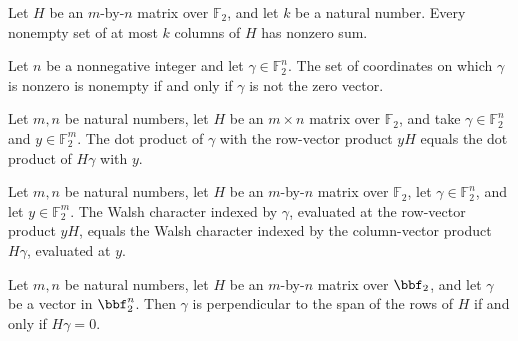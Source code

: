\begin{definition}
\label{FABL.HasNonzeroColumnSumsUpTo}
\leanok
{}
Let $H$ be an $m$-by-$n$ matrix over $\mathbb{F}_2$, and let $k$ be a natural number.
Every nonempty set of at most $k$ columns of $H$ has nonzero sum.
\end{definition}

\begin{theorem}
\leanok
{}
Let $n$ be a nonnegative integer and let $\gamma\in\mathbb F_2^n$. The set of
coordinates on which $\gamma$ is nonzero is nonempty if and only if $\gamma$ is not the
zero vector.
\end{theorem}

\begin{theorem}
\leanok
{}
Let $m,n$ be natural numbers, let $H$ be an $m\times n$ matrix over $\mathbb F_2$, and
take $\gamma\in\mathbb F_2^n$ and $y\in\mathbb F_2^m$. The dot product of $\gamma$ with
the row-vector product $yH$ equals the dot product of $H\gamma$ with $y$.
\end{theorem}

\begin{theorem}
\label{FABL.vectorWalshCharacter_vecMul}
\leanok
{}
Let $m,n$ be natural numbers, let $H$ be an $m$-by-$n$ matrix over $\mathbb F_2$, let
$\gamma\in\mathbb F_2^n$, and let $y\in\mathbb F_2^m$. The Walsh character indexed by
$\gamma$, evaluated at the row-vector product $yH$, equals the Walsh character indexed
by the column-vector product $H\gamma$, evaluated at $y$.
\end{theorem}

\begin{theorem}
\label{FABL.mem_perpendicular_matrixRowSpan_iff_mulVec_eq_zero}
\leanok
{}
Let $m,n$ be natural numbers, let $H$ be an $m$-by-$n$ matrix over $\bbf_2$, and let
$\gamma$ be a vector in $\bbf_2^n$. Then $\gamma$ is perpendicular to the span of the
rows of $H$ if and only if $H\gamma=0$.
\end{theorem}

